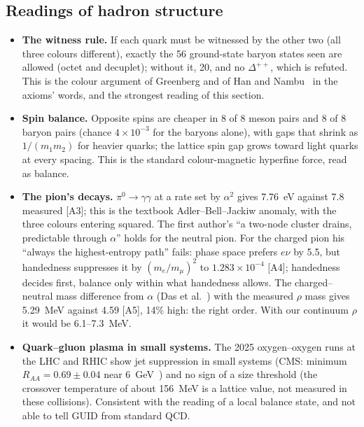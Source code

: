\documentclass[11pt,a4paper]{article}
\newcommand{\chk}[1]{\textsf{[#1]}}
\begin{document}
\subsection{Readings of hadron structure}
\begin{itemize}[leftmargin=*,itemsep=2pt]
\item \textbf{The witness rule.} If each quark must be witnessed by the other two (all three colours different), exactly the 56 ground-state
baryon states seen are allowed (octet and decuplet); without it, 20, and no $\Delta^{++}$, which is refuted. This is the colour argument of
Greenberg and of Han and Nambu~\cite{greenberg,hannambu} in the axioms' words, and the strongest reading of this section.
\item \textbf{Spin balance.} Opposite spins are cheaper in 8 of 8 meson pairs and 8 of 8 baryon pairs (chance $4\times10^{-3}$ for the baryons alone), with gaps that
shrink as $1/(m_1m_2)$ for heavier quarks; the lattice spin gap grows toward light quarks at every spacing. This is the standard colour-magnetic
hyperfine force, read as balance.
\item \textbf{The pion's decays.} $\pi^0\to\gamma\gamma$ at a rate set by $\alpha^2$ gives 7.76~eV against 7.8 measured \chk{A3}; this is the
textbook Adler--Bell--Jackiw anomaly, with the three colours entering squared. The first
author's ``a two-node cluster drains, predictable through $\alpha$'' holds for the neutral pion. For the charged pion his ``always the
highest-entropy path'' fails: phase space prefers $e\nu$ by 5.5, but handedness suppresses it by $(m_e/m_\mu)^2$ to $1.283\times10^{-4}$
\chk{A4}; handedness decides first, balance only within what handedness allows. The charged--neutral mass difference from $\alpha$ (Das et
al.~\cite{das}) with the measured $\rho$ mass gives 5.29~MeV against 4.59 \chk{A5}, 14\% high: the right order. With our continuum
$\rho$ it would be 6.1--7.3~MeV.
\item \textbf{Quark--gluon plasma in small systems.} The 2025 oxygen--oxygen runs at the LHC and RHIC show jet suppression in small
systems (CMS: minimum $R_{AA}=0.69\pm0.04$ near 6~GeV~\cite{cmsoo}) and no sign of a size threshold (the crossover temperature of about 156~MeV is a lattice value, not measured in these collisions).
Consistent with the reading of a local balance state, and not able to tell GUID from standard QCD.
\end{itemize}
\end{document}
